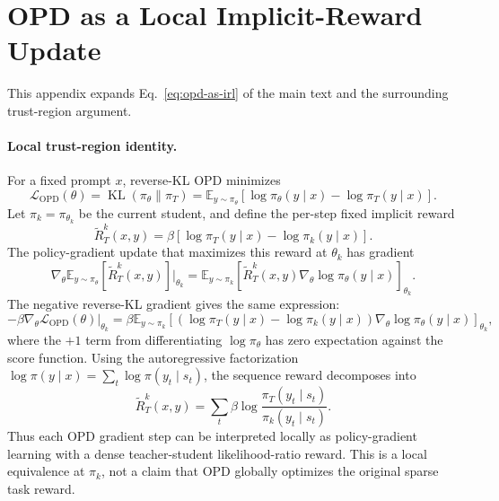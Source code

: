 \documentclass{article}
\begin{document}



\appendix

\section{OPD as a Local Implicit-Reward Update}
\label{app:opd-derivation}

This appendix expands Eq.~\ref{eq:opd-as-irl} of the main text and the surrounding trust-region argument.

\paragraph{Local trust-region identity.} For a fixed prompt $x$, reverse-KL OPD minimizes
\begin{equation}
\mathcal{L}_{\mathrm{OPD}}(\theta)=\operatorname{KL}(\pi_\theta\|\pi_T)=\mathbb{E}_{y\sim\pi_\theta}\left[\log\pi_\theta(y\mid x)-\log\pi_T(y\mid x)\right].
\end{equation}
Let $\pi_k=\pi_{\theta_k}$ be the current student, and define the per-step fixed implicit reward
\begin{equation}
\widetilde R_T^k(x,y)=\beta\left[\log\pi_T(y\mid x)-\log\pi_k(y\mid x)\right].
\end{equation}
The policy-gradient update that maximizes this reward at $\theta_k$ has gradient
\begin{equation}
\nabla_\theta \mathbb{E}_{y\sim\pi_\theta}[\widetilde R_T^k(x,y)]\big|_{\theta_k}
=\mathbb{E}_{y\sim\pi_k}\left[\widetilde R_T^k(x,y)\nabla_\theta\log\pi_\theta(y\mid x)\right]_{\theta_k}.
\end{equation}
The negative reverse-KL gradient gives the same expression:
\begin{equation}
-\beta\nabla_\theta\mathcal{L}_{\mathrm{OPD}}(\theta)\big|_{\theta_k}
=\beta\mathbb{E}_{y\sim\pi_k}\left[\left(\log\pi_T(y\mid x)-\log\pi_k(y\mid x)\right)\nabla_\theta\log\pi_\theta(y\mid x)\right]_{\theta_k},
\end{equation}
where the $+1$ term from differentiating $\log\pi_\theta$ has zero expectation against the score function. Using the autoregressive factorization $\log\pi(y\mid x)=\sum_t\log\pi(y_t\mid s_t)$, the sequence reward decomposes into
\begin{equation}
\widetilde R_T^k(x,y)=\sum_t \beta\log\frac{\pi_T(y_t\mid s_t)}{\pi_k(y_t\mid s_t)}.
\end{equation}
Thus each OPD gradient step can be interpreted locally as policy-gradient learning with a dense teacher-student likelihood-ratio reward. This is a local equivalence at $\pi_k$, not a claim that OPD globally optimizes the original sparse task reward.
\end{document}
